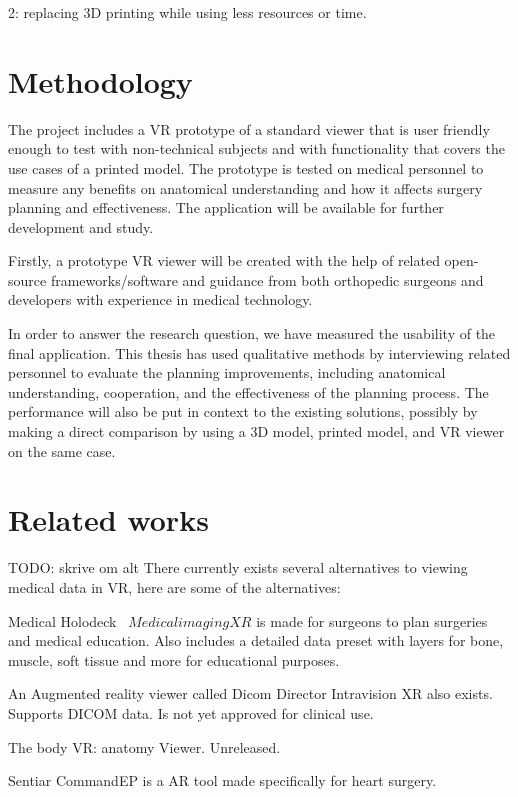 \documentclass[a4paper]{report}
\begin{document}
2: replacing 3D printing while using less resources or time.

\section{Methodology}

The project includes a VR prototype of a standard viewer that is user friendly enough to test with non-technical subjects and with functionality that covers the use cases of a printed model.
The prototype is tested on medical personnel to measure any benefits on anatomical understanding and how it affects surgery planning and effectiveness.
The application will be available for further development and study.

Firstly, a prototype VR viewer will be created with the help of related
open-source frameworks/software and guidance from both orthopedic surgeons and
developers with experience in medical technology.

In order to answer the research question, we have measured the
usability of the final application. This thesis has used qualitative methods
by interviewing related personnel to evaluate the planning improvements, including
anatomical understanding, cooperation, and the effectiveness of the planning
process.
The performance will also be put in context to the existing solutions, possibly
by making a direct comparison by using a 3D model, printed model, and VR viewer
on the same case.

\section{Related works}
TODO: skrive om alt
There currently exists several alternatives to viewing medical data in VR, here are some of the alternatives:

Medical Holodeck~\cite{medical_holodeck_medicalholodeck_nodate} $Medical imaging XR$ is made for surgeons to plan surgeries and medical education. Also includes a detailed data preset with layers for bone, muscle, soft tissue and more for educational purposes.

An Augmented reality viewer called Dicom Director Intravision XR also exists. Supports DICOM data. Is not yet approved for clinical use.\cite{dicomdirectorcom_surgeons_nodate}

The body VR: anatomy Viewer\cite{the body}. Unreleased.

Sentiar CommandEP is a AR tool made specifically for heart surgery. 
\end{document}
